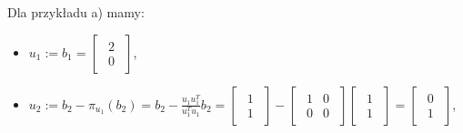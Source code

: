 \documentclass{article}
\begin{document}
\begin{enumerate}
Dla przykładu a) mamy:
\begin{itemize}
    \item $u_{1} := b_{1} = \begin{bmatrix}\begin{array}{r} 2\\ 0 \end{array}\end{bmatrix}$,
    \item $u_{2} := b_{2} - \pi_{u_{1}}(b_{2}) = b_{2} - \frac{u_{1}u_{1}^{T}}{u_{1}^{T}u_{1}}b_{2} = \begin{bmatrix}\begin{array}{r} 1\\ 1 \end{array}\end{bmatrix} - \begin{bmatrix}\begin{array}{rr} 1&0\\ 0&0 \end{array}\end{bmatrix} \begin{bmatrix}\begin{array}{r} 1\\ 1 \end{array}\end{bmatrix} = \begin{bmatrix}\begin{array}{r} 0\\ 1 \end{array}\end{bmatrix}$,
\end{itemize}


\end{enumerate}
\end{document}
